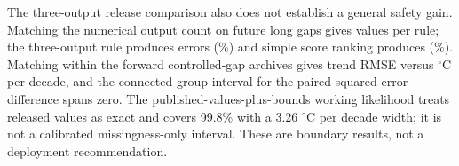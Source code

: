 The three-output release comparison also does not establish a general safety gain. Matching the numerical output count on future long gaps gives \CCReleaseFutureN{} values per rule; the three-output rule produces \CCReleaseThreeError{} errors (\CCReleaseThreeRate\%) and simple score ranking produces \CCReleaseScoreError{} (\CCReleaseScoreRate\%). Matching within the \CCArchiveMatchedN{} forward controlled-gap archives gives trend RMSE \CCArchiveMatchedThreeRMSE{} versus \CCArchiveMatchedScoreRMSE{} $^{\circ}$C per decade, and the connected-group interval for the paired squared-error difference spans zero. The published-values-plus-bounds working likelihood treats released values as exact and covers 99.8\% with a 3.26 $^{\circ}$C per decade width; it is not a calibrated missingness-only interval. These are boundary results, not a deployment recommendation.
